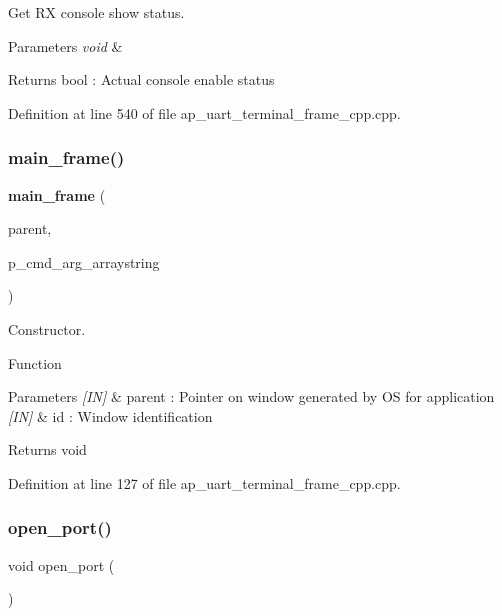 Get RX console show status. 


\begin{DoxyParams}{Parameters}
{\em void} & \\
\hline
\end{DoxyParams}
\begin{DoxyReturn}{Returns}
bool \+: Actual console enable status 
\end{DoxyReturn}


Definition at line 540 of file ap\+\_\+uart\+\_\+terminal\+\_\+frame\+\_\+cpp.\+cpp.

\mbox{\label{group___u_a_r_t__terminal_gac6d177669b3810c95fed339b05281e82}} 
\subsubsection{main\_frame()}
{\footnotesize\ttfamily \textbf{ main\+\_\+frame} (\begin{DoxyParamCaption}\item[{wx\+Window $\ast$}]{parent,  }\item[{wx\+Array\+String $\ast$}]{p\+\_\+cmd\+\_\+arg\+\_\+arraystring }\end{DoxyParamCaption})}



Constructor. 

Function
\begin{DoxyParams}{Parameters}
{\em \mbox{[}\+I\+N\mbox{]}} & parent \+: Pointer on window generated by OS for application \\
\hline
{\em \mbox{[}\+I\+N\mbox{]}} & id \+: Window identification \\
\hline
\end{DoxyParams}
\begin{DoxyReturn}{Returns}
void 
\end{DoxyReturn}


Definition at line 127 of file ap\+\_\+uart\+\_\+terminal\+\_\+frame\+\_\+cpp.\+cpp.

\mbox{\label{group___u_a_r_t__terminal_gaeb58113a5a9df68000116b815e75ef76}} 
\subsubsection{open\_port()}
{\footnotesize\ttfamily void open\+\_\+port (\begin{DoxyParamCaption}\item[{void}]{ }\end{DoxyParamCaption})}



